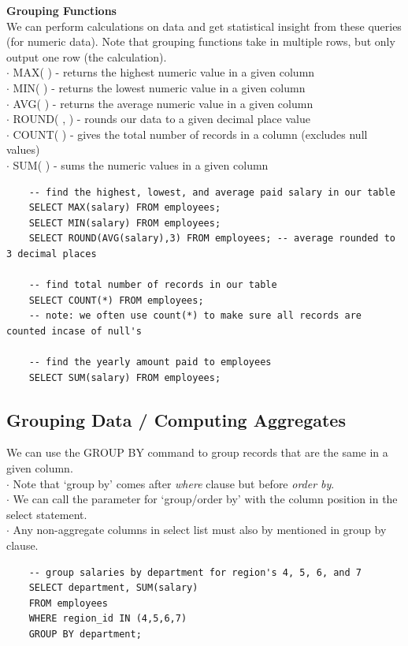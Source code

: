 \documentclass[11pt, a4paper]{article}
\begin{document}
\begin{spacing}{1.1}
	\noindent \large \textbf{Grouping Functions} \normalsize \vspace*{2mm} \\
	We can perform calculations on data and get statistical insight from these queries (for numeric data). Note that grouping functions take in multiple rows, but only output one row (the calculation). \\
	\hspace*{3mm} $\cdot$ MAX( ) - returns the highest numeric value in a given column \\
	\hspace*{3mm} $\cdot$ MIN( ) - returns the lowest numeric value in a given column \\
	\hspace*{3mm} $\cdot$ AVG( ) - returns the average numeric value in a given column \\
	\hspace*{3mm} $\cdot$ ROUND( , ) - rounds our data to a given decimal place value \\
	\hspace*{3mm} $\cdot$ COUNT( ) - gives the total number of records in a column (excludes null values) \\
	\hspace*{3mm} $\cdot$ SUM( ) - sums the numeric values in a given column
	\begin{lstlisting}
	-- find the highest, lowest, and average paid salary in our table
	SELECT MAX(salary) FROM employees;
	SELECT MIN(salary) FROM employees;
	SELECT ROUND(AVG(salary),3) FROM employees; -- average rounded to 3 decimal places
	
	-- find total number of records in our table
	SELECT COUNT(*) FROM employees;
	-- note: we often use count(*) to make sure all records are counted incase of null's
	
	-- find the yearly amount paid to employees
	SELECT SUM(salary) FROM employees; 	\end{lstlisting} \newpage
	
	\subsection{Grouping Data / Computing Aggregates}
	We can use the GROUP BY command to group records that are the same in a given column. \\
	\hspace*{3mm} $\cdot$ Note that `group by' comes after \textit{where} clause but before \textit{order by}. \\
	\hspace*{3mm} $\cdot$ We can call the parameter for `group/order by' with the column position in the select statement. \\
	\hspace*{3mm} $\cdot$ Any non-aggregate columns in select list must also by mentioned in group by clause.
	\begin{lstlisting}
	-- group salaries by department for region's 4, 5, 6, and 7
	SELECT department, SUM(salary)
	FROM employees
	WHERE region_id IN (4,5,6,7)
	GROUP BY department; 
	

\end{lstlisting}
\end{spacing}
\end{document}
